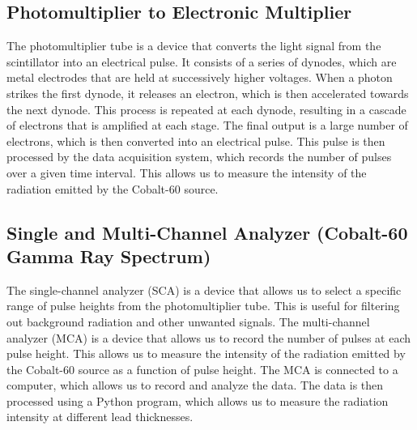 \documentclass[12pt]{article}
\begin{document}
        \subsection{Photomultiplier to Electronic Multiplier}
            The photomultiplier tube is a device that converts the light signal from the scintillator into an electrical pulse. 
            It consists of a series of dynodes, which are metal electrodes that are held at successively higher voltages. 
            When a photon strikes the first dynode, it releases an electron, which is then accelerated towards the next dynode. 
            This process is repeated at each dynode, resulting in a cascade of electrons that is amplified at each stage. 
            The final output is a large number of electrons, which is then converted into an electrical pulse. 
            This pulse is then processed by the data acquisition system, which records the number of pulses over a given time interval. 
            This allows us to measure the intensity of the radiation emitted by the Cobalt-60 source.
            
        \subsection{Single and Multi-Channel Analyzer (Cobalt-60 Gamma Ray Spectrum)}
            The single-channel analyzer (SCA) is a device that allows us to select a specific range of pulse heights from the photomultiplier tube. 
            This is useful for filtering out background radiation and other unwanted signals. 
            The multi-channel analyzer (MCA) is a device that allows us to record the number of pulses at each pulse height. 
            This allows us to measure the intensity of the radiation emitted by the Cobalt-60 source as a function of pulse height. 
            The MCA is connected to a computer, which allows us to record and analyze the data. 
            The data is then processed using a Python program, which allows us to measure the radiation intensity at different lead thicknesses.
            
\end{document}
